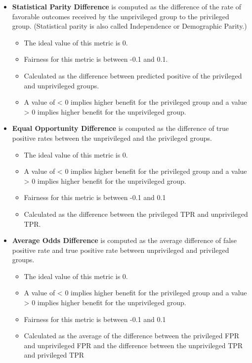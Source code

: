 \documentclass[assignment03_Solutions]{subfiles}
\begin{document}
\begin{itemize}
    \item \textbf{Statistical Parity Difference} is computed as the difference of the rate of favorable outcomes received by the unprivileged group to the privileged group. (Statistical parity is also called Independence or Demographic Parity.)
    \begin{itemize}
        \item The ideal value of this metric is 0.
        \item Fairness for this metric is between -0.1 and 0.1.
        \item Calculated as the difference between predicted positive of the privileged and unprivileged groups.
        \item A value of < 0 implies higher benefit for the privileged group and a value > 0 implies higher benefit for the unprivileged group.
    \end{itemize}
    \item \textbf{Equal Opportunity Difference} is computed as the difference of true positive rates between the unprivileged and the privileged groups.
    \begin{itemize}
        \item The ideal value of this metric is 0.
        \item A value of < 0 implies higher benefit for the privileged group and a value > 0 implies higher benefit for the unprivileged group.
        \item Fairness for this metric is between -0.1 and 0.1
        \item Calculated as the difference between the privileged TPR and unprivileged TPR.
    \end{itemize}
    \item \textbf{Average Odds Difference} is computed as the average difference of false positive rate and true positive rate between unprivileged and privileged groups.
    \begin{itemize}
        \item The ideal value of this metric is 0.
        \item A value of < 0 implies higher benefit for the privileged group and a value > 0 implies higher benefit for the unprivileged group.
        \item Fairness for this metric is between -0.1 and 0.1
        \item Calculated as the average of the difference between the privileged FPR and unprivileged FPR and the difference between the unprivileged TPR and privileged TPR

\end{itemize}
\end{itemize}
\end{document}
